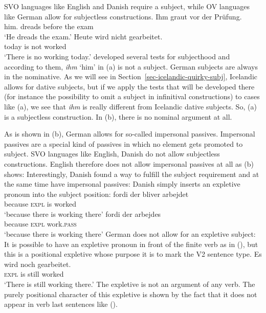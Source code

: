 SVO languages like English and Danish require a subject, while OV languages like German allow for
subjectless constructions.
\eal
\ex 
\gll Ihm graut vor der Prüfung.\\
     him.\DAT{} dreads before the exam\\\german
\glt `He dreads the exam.'
\ex 
\gll Heute wird nicht gearbeitet.\\
     today is   not worked\\
\glt `There is no working today.'
\zl
\citet{Reis82} developed several tests for subjecthood and according to them, \emph{ihm} `him' in
(a) is not a subject. German subjects are always in the nominative. As we will see in Section~\ref{sec-icelandic-quirky-subj},
Icelandic allows for dative subjects, but if we apply the tests that will be developed there (for instance the possibility to
omit a subject in infinitival constructions) to cases like (a), we see that \emph{ihm} is
really different from Icelandic dative subjects. So, (a) is a subjectless construction.
In (b), there is no nominal argument at all. 

As is shown in (b), German allows for so-called impersonal passives. Impersonal passives are
a special kind of passives in which no element gets promoted to subject. SVO languages like English,
Danish do not allow subjectless constructions. English therefore does not allow impersonal passives
at all as (b) shows:
\eal
{}
\zl
Interestingly, Danish found a way to fulfill the subject requirement and at the same time have
impersonal passives: Danish simply inserts an expletive pronoun into the subject position:
\eal
\label{ex-bliver-arbejder}
\ex 
\gll fordi der bliver arbejdet\\
     because \textsc{expl} is worked\\\danish
\glt `because there is working there'
\ex
\gll fordi   der arbejdes\\
     because  \textsc{expl} work.\textsc{pass}\\
\glt `because there is working there'
\zl
German does not allow for an expletive subject:
\z
It is possible to have an expletive pronoun in front of the finite verb as in (), but this is
a positional expletive whose purpose it is to mark the V2 sentence type. 
\ea
\gll  Es wird noch gearbeitet.\\
      \textsc{expl} is still worked\\\german
\glt `There is still working there.'
\z
The expletive is not an argument of any verb. The purely positional character of this expletive is shown by the fact that it does not
appear in verb last sentences like ().

